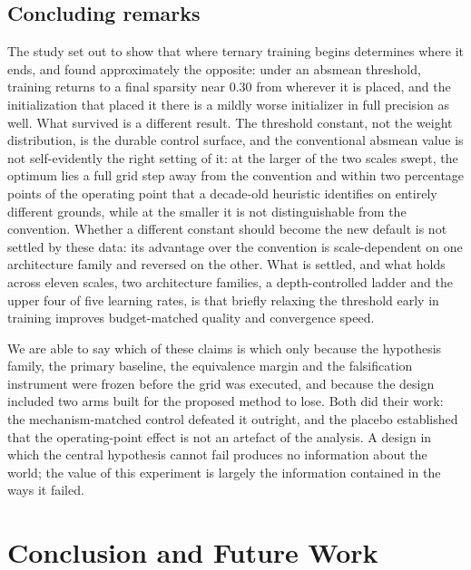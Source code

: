\documentclass[final,5p,times,twocolumn]{elsarticle}
\theoremstyle{remark}
\begin{document}
\subsection{Concluding remarks}
\label{sec:disc-conclusion}

The study set out to show that where ternary training begins determines where
it ends, and found approximately the opposite: under an absmean threshold,
training returns to a final sparsity near $0.30$ from wherever it is placed,
and the initialization that placed it there is a mildly worse initializer in
full precision as well. What survived is a different result. The threshold constant, not the weight
distribution, is the durable control surface, and the conventional absmean
value is not self-evidently the right setting of it: at the larger of the two
scales swept, the optimum lies a full grid step away from the convention and
within two percentage points of the operating point that a decade-old
heuristic identifies on entirely different grounds, while at the smaller it is
not distinguishable from the convention. Whether a different constant should become the new default is not
settled by these data: its advantage over the convention is scale-dependent on
one architecture family and reversed on the other. What is settled, and what
holds across eleven scales, two architecture families, a depth-controlled
ladder and the upper four of five learning rates, is that briefly relaxing the
threshold early in training improves budget-matched quality and convergence
speed.

We are able to say which of these claims is which only because the hypothesis
family, the primary baseline, the equivalence margin and the falsification
instrument were frozen before the grid was executed, and because the design
included two arms built for the proposed method to lose. Both did their work:
the mechanism-matched control defeated it outright, and the placebo established
that the operating-point effect is not an artefact of the analysis. A design in which the central hypothesis cannot fail produces
no information about the world; the value of this experiment is largely the
information contained in the ways it failed.



\section{Conclusion and Future Work}
\label{sec:conclusion}
\end{document}
